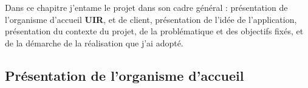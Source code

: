 \documentclass[a4paper]{report}
\begin{document}
\renewcommand{\headrulewidth}{1pt}
\fancyhead[L]{\hspace*{5cm}}
\begin{doublespace}
    Dans ce chapitre j'entame le projet dans son cadre général : présentation de l’organisme d’accueil \textbf{UIR},
    et de client, présentation de l'idée de l'application, présentation du contexte du projet, de la problématique et des objectifs fixés,
    et de la démarche de la réalisation que j'ai adopté.
\end{doublespace}
\begin{doublespace}
    \section{Présentation de l’organisme d’accueil}

\end{doublespace}
\end{document}
